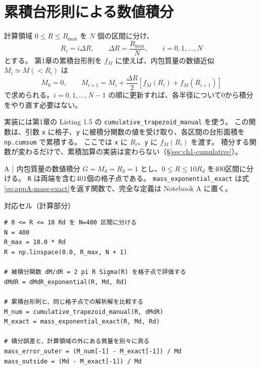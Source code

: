 \section{累積台形則による数値積分}
\label{sec:appA-cumulative}

計算領域 $0\le R\le R_{\max}$ を $N$ 個の区間に分け、
\begin{equation}
 R_i=i\Delta R,\qquad \Delta R=\frac{R_{\max}}{N},\qquad i=0,1,\ldots,N
\label{eq:appA-grid}
\end{equation}
とする。
第1章の累積台形則を $f_M$ に使えば、内包質量の数値近似 $M_i\simeq M(<R_i)$ は
\begin{equation}
 M_0=0,\qquad M_{i+1}=M_i+\frac{\Delta R}{2}\left[f_M(R_i)+f_M(R_{i+1})\right]
\label{eq:appA-cumulative-trapezoid}
\end{equation}
で求められる。$i=0,1,\ldots,N-1$ の順に更新すれば、各半径について0から積分をやり直す必要はない。

実装には第1章の Listing 1.5 の \texttt{cumulative\_trapezoid\_manual} を使う。
この関数は、引数 \texttt{x} に格子、\texttt{y} に被積分関数の値を受け取り、各区間の台形面積を \texttt{np.cumsum} で累積する。
ここでは \texttt{x} に $R_i$、\texttt{y} に $f_M(R_i)$ を渡す。
積分する関数が変わるだけで、累積加算の実装は変わらない（\S\ref{sec:ch1-cumulative}）。

\begin{notebookblock}{A｜内包質量の数値積分}
$G=M_d=R_d=1$ とし、$0\le R\le10R_d$ を400区間に分ける。
\texttt{R} は両端を含む401個の格子点である。
\texttt{mass\_exponential\_exact} は式\eqref{eq:appA-mass-exact}を返す関数で、完全な定義は Notebook A に置く。

{\sffamily\small\color{graytext}対応セル（計算部分）}
\begin{Verbatim}[xleftmargin=2mm,fontsize=\small,frame=single,framesep=1.8mm,framerule=0.35pt,rulecolor=\color{listingframe},fillcolor=\color{listingbg}]
# 0 <= R <= 10 Rd を N=400 区間に分ける
N = 400
R_max = 10.0 * Rd
R = np.linspace(0.0, R_max, N + 1)

# 被積分関数 dM/dR = 2 pi R Sigma(R) を格子点で評価する
dMdR = dMdR_exponential(R, Md, Rd)

# 累積台形則と、同じ格子点での解析解を比較する
M_num = cumulative_trapezoid_manual(R, dMdR)
M_exact = mass_exponential_exact(R, Md, Rd)

# 積分誤差と、計算領域の外にある質量を別々に測る
mass_error_outer = (M_num[-1] - M_exact[-1]) / Md
mass_outside = (Md - M_exact[-1]) / Md
\end{Verbatim}
\end{notebookblock}

